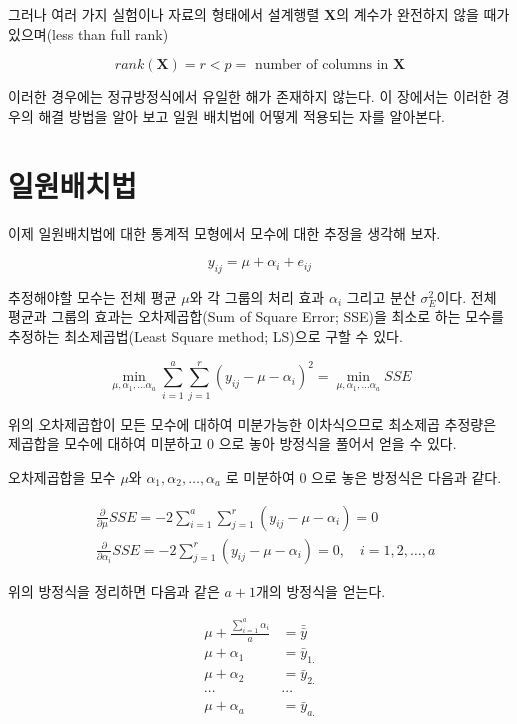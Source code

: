\documentclass[
  10pt,
]{book}
\newcommand{\pardiff}[2]{\frac{\partial #1}{\partial #2 }}
\theoremstyle{definition}
\theoremstyle{definition}
\theoremstyle{definition}
\theoremstyle{definition}
\theoremstyle{remark}
\begin{document}
그러나 여러 가지 실험이나 자료의 형태에서 설계행렬 \(\bm X\)의 계수가 완전하지 않을 때가 있으며(less than full rank)

\[
rank(\bm X) =r < p= \text{ number of columns in } \bm X 
\]

이러한 경우에는 정규방정식에서 유일한 해가 존재하지 않는다. 이 장에서는 이러한 경우의 해결 방법을 알아 보고 일원 배치법에 어떻게 적용되는 자를 알아본다.

\hypertarget{uxc77cuxc6d0uxbc30uxce58uxbc95}{%
\section{일원배치법}\label{uxc77cuxc6d0uxbc30uxce58uxbc95}}

이제 일원배치법에 대한 통계적 모형에서 모수에 대한 추정을 생각해 보자.

\begin{equation}
y_{ij} = \mu + \alpha_i + e_{ij} 
\label{eq:oneway}
\end{equation}

추정해야할 모수는 전체 평균 \(\mu\)와 각 그룹의 처리 효과 \(\alpha_i\) 그리고 분산 \(\sigma_E^2\)이다. 전체 평균과 그룹의 효과는 오차제곱합(Sum of Square Error; SSE)을 최소로 하는 모수를 추정하는 최소제곱법(Least Square method; LS)으로 구할 수 있다.

\begin{equation} 
 \min_{\mu, \alpha_1, \dots \alpha_a} \sum_{i=1}^a \sum_{j=1}^r 
(y_{ij} - \mu -\alpha_i)^2 =\min_{\mu, \alpha_1, \dots \alpha_a} SSE 
\label{eq:lsesse}
\end{equation}

위의 오차제곱합이 모든 모수에 대하여 미분가능한 이차식으므로 최소제곱 추정량은 제곱합을 모수에 대하여 미분하고 0 으로 놓아 방정식을 풀어서 얻을 수 있다.

오차제곱합을 모수 \(\mu\)와 \(\alpha_1,\alpha_2,\dots,\alpha_a\) 로 미분하여 0 으로 놓은 방정식은 다음과 같다.

\begin{align*}
& \pardiff{}{\mu} SSE = -2 \sum_{i=1}^a \sum_{j=1}^r (y_{ij} - \mu -\alpha_i) = 0 \\
& \pardiff{}{\alpha_i} SSE = -2 \sum_{j=1}^r (y_{ij} - \mu -\alpha_i) = 0 , \quad i=1,2,\dots, a 
\end{align*}

위의 방정식을 정리하면 다음과 같은 \(a+1\)개의 방정식을 얻는다.

\begin{align}
   \mu +\frac{ \sum_{i=1}^a \alpha_i}{a} & = \bar {\bar y}\\
   \mu + \alpha_1  & =  \bar {y}_{1.} \\
   \mu + \alpha_2  & =  \bar {y}_{2.} \\
         \cdots & \cdots \\
   \mu + \alpha_a  & =  \bar {y}_{a.} \\
\label{eq:normaleq1}   
\end{align}
\end{document}
